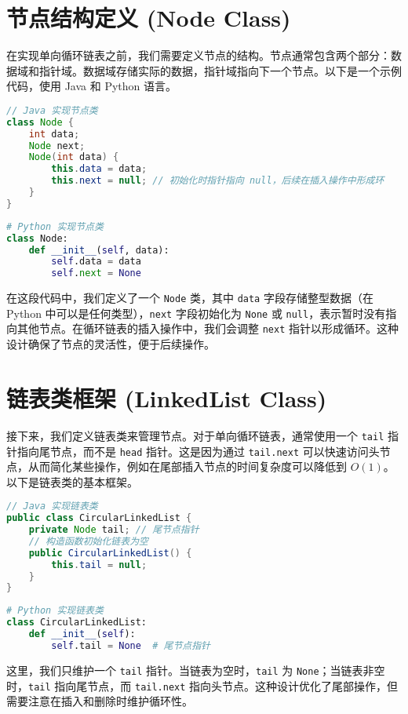\section{节点结构定义 (Node Class)}
在实现单向循环链表之前，我们需要定义节点的结构。节点通常包含两个部分：数据域和指针域。数据域存储实际的数据，指针域指向下一个节点。以下是一个示例代码，使用 Java 和 Python 语言。\par
\begin{lstlisting}[language=java]
// Java 实现节点类
class Node {
    int data;
    Node next;
    Node(int data) {
        this.data = data;
        this.next = null; // 初始化时指针指向 null，后续在插入操作中形成环
    }
}
\end{lstlisting}
\begin{lstlisting}[language=python]
# Python 实现节点类
class Node:
    def __init__(self, data):
        self.data = data
        self.next = None
\end{lstlisting}
在这段代码中，我们定义了一个 \texttt{Node} 类，其中 \texttt{data} 字段存储整型数据（在 Python 中可以是任何类型），\texttt{next} 字段初始化为 \texttt{None} 或 \texttt{null}，表示暂时没有指向其他节点。在循环链表的插入操作中，我们会调整 \texttt{next} 指针以形成循环。这种设计确保了节点的灵活性，便于后续操作。\par
\section{链表类框架 (LinkedList Class)}
接下来，我们定义链表类来管理节点。对于单向循环链表，通常使用一个 \texttt{tail} 指针指向尾节点，而不是 \texttt{head} 指针。这是因为通过 \texttt{tail.next} 可以快速访问头节点，从而简化某些操作，例如在尾部插入节点的时间复杂度可以降低到 $O(1)$。以下是链表类的基本框架。\par
\begin{lstlisting}[language=java]
// Java 实现链表类
public class CircularLinkedList {
    private Node tail; // 尾节点指针
    // 构造函数初始化链表为空
    public CircularLinkedList() {
        this.tail = null;
    }
}
\end{lstlisting}
\begin{lstlisting}[language=python]
# Python 实现链表类
class CircularLinkedList:
    def __init__(self):
        self.tail = None  # 尾节点指针
\end{lstlisting}
这里，我们只维护一个 \texttt{tail} 指针。当链表为空时，\texttt{tail} 为 \texttt{None}；当链表非空时，\texttt{tail} 指向尾节点，而 \texttt{tail.next} 指向头节点。这种设计优化了尾部操作，但需要注意在插入和删除时维护循环性。\par

